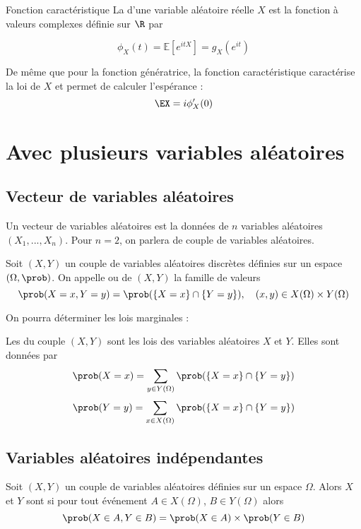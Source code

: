 \begin{definition}{Fonction caractéristique}{}
La  d'une variable aléatoire réelle $X$ est la fonction à valeurs complexes définie sur $\R$ par

$$\phi_{X}(t) =\mathbb{E}\left[e^{i tX}\right]=g_X(e^{i t})$$
\end{definition}


De même que pour la fonction génératrice, la fonction caractéristique caractérise la loi de $X$ et permet de calculer l'espérance : 
$$\EX = i\phi_X'(0)$$

\section{Avec plusieurs variables aléatoires}
\subsection{Vecteur de variables aléatoires}

Un vecteur de variables aléatoires est la données de $n$ variables aléatoires $(X_1,...,X_n)$. Pour $n=2$, on parlera de couple de variables aléatoires.

\begin{definition}{}{}
	Soit $(X,Y)$ un couple de variables aléatoires discrètes définies sur un espace $(\Omega,\prob)$. On appelle  ou  de $(X,Y)$ la famille de valeurs 
	$$\prob(X=x,Y=y) = \prob(\{X=x\}\cap \{Y=y\}), \quad (x,y)\in X(\Omega) \times Y(\Omega)$$
\end{definition}

On pourra déterminer les lois marginales :

\begin{definition}{}{}
	Les  du couple $(X,Y)$ sont les lois des variables aléatoires $X$ et $Y$. Elles sont données par 
	$$\prob(X=x)=\sum_{y \in Y(\Omega)} \prob(\{X=x\}\cap \{Y=y\})$$
		$$\prob(Y=y)=\sum_{x \in X(\Omega)} \prob(\{X=x\}\cap \{Y=y\})$$
\end{definition}

\subsection{Variables aléatoires indépendantes}

\begin{definition}{}{}
	Soit $(X,Y)$ un couple de variables aléatoires définies sur un espace $\Omega$. Alors $X$ et $Y$ sont  si pour tout événement $A \in X(\Omega)$, $B \in Y(\Omega)$ alors
	$$\prob(X \in A, Y \in B)=\prob(X \in A) \times \prob(Y \in B)$$
	
\end{definition}

